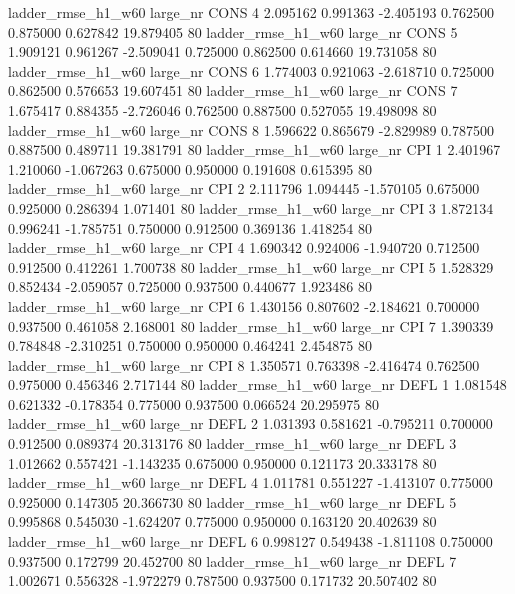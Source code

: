  ladder_rmse_h1_w60   large_nr     CONS                 4  2.095162  0.991363  -2.405193 0.762500 0.875000  0.627842   19.879405 80
 ladder_rmse_h1_w60   large_nr     CONS                 5  1.909121  0.961267  -2.509041 0.725000 0.862500  0.614660   19.731058 80
 ladder_rmse_h1_w60   large_nr     CONS                 6  1.774003  0.921063  -2.618710 0.725000 0.862500  0.576653   19.607451 80
 ladder_rmse_h1_w60   large_nr     CONS                 7  1.675417  0.884355  -2.726046 0.762500 0.887500  0.527055   19.498098 80
 ladder_rmse_h1_w60   large_nr     CONS                 8  1.596622  0.865679  -2.829989 0.787500 0.887500  0.489711   19.381791 80
 ladder_rmse_h1_w60   large_nr      CPI                 1  2.401967  1.210060  -1.067263 0.675000 0.950000  0.191608    0.615395 80
 ladder_rmse_h1_w60   large_nr      CPI                 2  2.111796  1.094445  -1.570105 0.675000 0.925000  0.286394    1.071401 80
 ladder_rmse_h1_w60   large_nr      CPI                 3  1.872134  0.996241  -1.785751 0.750000 0.912500  0.369136    1.418254 80
 ladder_rmse_h1_w60   large_nr      CPI                 4  1.690342  0.924006  -1.940720 0.712500 0.912500  0.412261    1.700738 80
 ladder_rmse_h1_w60   large_nr      CPI                 5  1.528329  0.852434  -2.059057 0.725000 0.937500  0.440677    1.923486 80
 ladder_rmse_h1_w60   large_nr      CPI                 6  1.430156  0.807602  -2.184621 0.700000 0.937500  0.461058    2.168001 80
 ladder_rmse_h1_w60   large_nr      CPI                 7  1.390339  0.784848  -2.310251 0.750000 0.950000  0.464241    2.454875 80
 ladder_rmse_h1_w60   large_nr      CPI                 8  1.350571  0.763398  -2.416474 0.762500 0.975000  0.456346    2.717144 80
 ladder_rmse_h1_w60   large_nr     DEFL                 1  1.081548  0.621332  -0.178354 0.775000 0.937500  0.066524   20.295975 80
 ladder_rmse_h1_w60   large_nr     DEFL                 2  1.031393  0.581621  -0.795211 0.700000 0.912500  0.089374   20.313176 80
 ladder_rmse_h1_w60   large_nr     DEFL                 3  1.012662  0.557421  -1.143235 0.675000 0.950000  0.121173   20.333178 80
 ladder_rmse_h1_w60   large_nr     DEFL                 4  1.011781  0.551227  -1.413107 0.775000 0.925000  0.147305   20.366730 80
 ladder_rmse_h1_w60   large_nr     DEFL                 5  0.995868  0.545030  -1.624207 0.775000 0.950000  0.163120   20.402639 80
 ladder_rmse_h1_w60   large_nr     DEFL                 6  0.998127  0.549438  -1.811108 0.750000 0.937500  0.172799   20.452700 80
 ladder_rmse_h1_w60   large_nr     DEFL                 7  1.002671  0.556328  -1.972279 0.787500 0.937500  0.171732   20.507402 80
